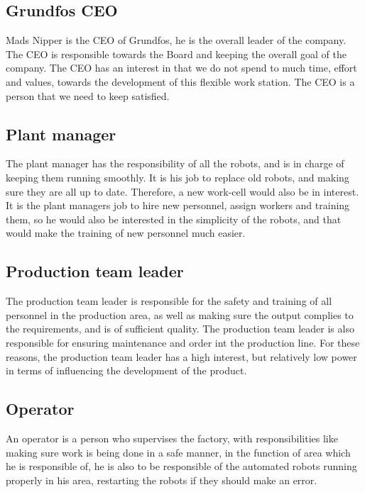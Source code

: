 \subsection{Grundfos CEO}\label{ch:grundfosas-CEO}
Mads Nipper is the CEO of Grundfos, he is the overall leader of the company. The CEO is responsible towards the Board and keeping the overall goal of the company. The CEO has an interest in that we do not spend to much time, effort and values, towards the development of this flexible work station. The CEO is a person that we need  to keep satisfied.\\

\subsection{Plant manager}\label{ch:Plant-manager} 
The plant manager has the responsibility of all the robots, and is in charge of keeping them running smoothly. It is his job to replace old robots, and making sure they are all up to date. Therefore, a new work-cell would also be in interest. It is the plant managers job to hire new personnel, assign workers and training them, so he would also be interested in the simplicity of the robots, and that would make the training of new personnel much easier. \\

\subsection{Production team leader}\label{ch:Production-team-leader}
The production team leader is responsible for the safety and training of all personnel in the production area, as well as making sure the output complies to the requirements, and is of sufficient quality. The production team leader is also responsible for ensuring maintenance and order int the production line. For these reasons, the production team leader has a high interest, but relatively low power in terms of influencing the development of the product. 


\subsection{Operator}\label{ch:grundfosemp-stake}
An operator is a person who supervises the factory, with responsibilities like making sure work is being done in a safe manner, in the function of area which he is responsible of, he is also to be responsible of the automated robots running properly in his area, restarting the robots if they should make an error.\\

